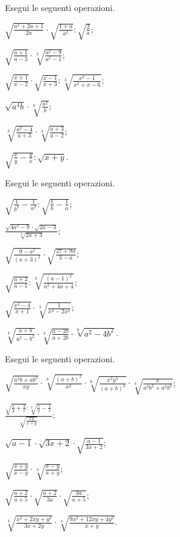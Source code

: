 \begin{esercizio}[\Ast]
 \label{ese:2.42}
Esegui le seguenti operazioni.
 \begin{multicols}{2}
 \begin{enumeratea}
 \item $\sqrt{\frac{a^2+2a+1}{2a}}\cdot \sqrt{\frac{1+a}{a^2}}:\sqrt{\frac 2 a}$;
 \item $\sqrt{\frac{a+1}{a-3}}\cdot \sqrt[3]{\frac{a^2-9}{a^2-1}}$;
 \item $\sqrt{\frac{x+1}{x-2}}\cdot \sqrt{\frac{x-1}{x+3}}:\sqrt[3]{\frac{x^2-1}{x^2+x-6}}$;
 \item $\sqrt{a^4b}\cdot \sqrt[6]{\frac{a^2} b}$;
 \item $\sqrt[3]{\frac{a^2-4}{a+3}}\cdot \sqrt[4]{\frac{a+3}{a-2}}$;
 \item $\sqrt{\frac x y-\frac y x}:\sqrt{x+y}$.
 \end{enumeratea}
 \end{multicols}
\end{esercizio}

\begin{esercizio}[\Ast]
 \label{ese:2.43}
Esegui le seguenti operazioni.
 \begin{multicols}{2}
 \begin{enumeratea}
 \item $\sqrt{\frac 1{b^2}-\frac 1{a^2}}:\sqrt{\frac 1 b-\frac 1 a}$;
 \item $\frac{\sqrt{4a^2-9}\cdot \sqrt{2a-3}}{\sqrt[3]{2a+3}}$;
 \item $\sqrt{\frac{9-a^2}{(a+3)^2}}\cdot \sqrt{\frac{27+9a}{3-a}}$;
 \item $\sqrt{\frac{a+2}{a-1}}:\sqrt[3]{\frac{(a-1)^2}{a^2+4a+4}}$;
 \item $\sqrt{\frac{x^2-4}{x+1}}\cdot \sqrt[3]{\frac 1{x^3-2x^2}}$;
 \item $\sqrt[4]{\frac{a+b}{a^2-b^2}}\cdot \sqrt[3]{\frac{a-2b}{a+2b}}\cdot \sqrt[6]{a^2-4b^2}$.
 \end{enumeratea}
 \end{multicols}
\end{esercizio}

\begin{esercizio}[\Ast]
 \label{ese:2.44}
Esegui le seguenti operazioni.
 \begin{enumeratea}
 \item $\sqrt{\frac{a^2b+ab^2}{xy}}\cdot \sqrt[6]{\frac{(a+b)^2}{x^2}}\cdot \sqrt[6]{\frac{x^2y^3}{(a+b)^2}}\cdot \sqrt[4]{\frac x{a^3b^2+a^2b^3}}$;
 \item $\frac{\sqrt{\frac x y+\frac y x}:\sqrt[3]{\frac x y-\frac 1 x}}{\sqrt{\frac{xy}{x+y}}}$;
 \item $\sqrt{a-1}\cdot\sqrt{3x+2}\cdot\sqrt{\frac{a-1}{3x+2}}$;
 \item $\sqrt{\frac{x+y}{x-y}}\cdot\sqrt[3]{\frac{x-y}{x+y}}$;
 \item $\sqrt{\frac{a+2}{a+5}}\cdot\sqrt{\frac{a+2}{3a}}\cdot\sqrt{\frac{3a}{a+5}}$;
 \item $\sqrt[4]{\frac{x^2+2xy+y^2}{3x+2y}}\cdot\sqrt[4]{\frac{9x^2+12xy+4y^2}{x+y}}$.
 \end{enumeratea}
\end{esercizio}

